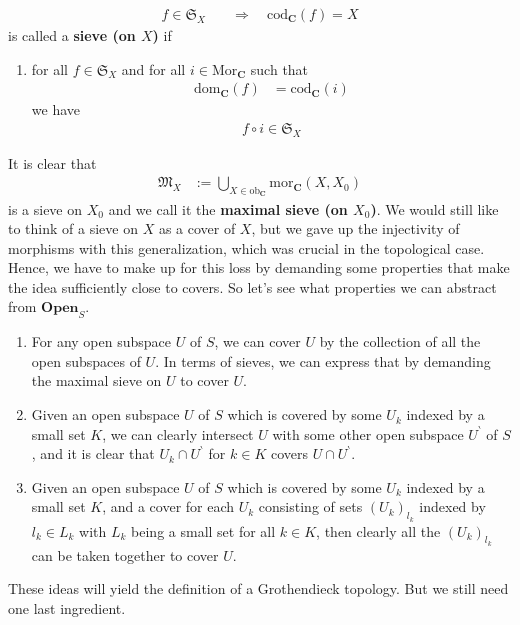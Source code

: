 \begin{exa}
\begin{align*}
  f
  \in
  \mathfrak{S}_{X}
  \quad
  &\Rightarrow
  \quad
  \mathrm{cod}_{\mathbf{C}}(f)
  =
  X
\end{align*}
is called a \textbf{sieve (on $X$)} if
\begin{enumerate}
\item[({\#})]
for all $f \in \mathfrak{S}_{X}$ and for all $i \in \mathrm{Mor}_{\mathbf{C}}$ such that
\begin{align*}
  \mathrm{dom}_{\mathbf{C}}(f)
  &=
  \mathrm{cod}_{\mathbf{C}}(i)
\end{align*}
we have
\begin{align*}
  f
  \circ
  i
  \in
  \mathfrak{S}_{X}
\end{align*}
\end{enumerate}
It is clear that
\begin{align*}
  \mathfrak{M}_{X}
  &:=
  \bigcup_{X \in \mathrm{ob}_{\mathbf{C}}}
  \mathrm{mor}_{\mathbf{C}}(X,X_{0})
\end{align*}
is a sieve on $X_{0}$ and we call it the \textbf{maximal sieve (on $X_{0}$)}.
We would still like to think of a sieve on $X$ as a cover of $X$, but we gave up the injectivity of morphisms with this generalization, which was crucial in the topological case.
Hence, we have to make up for this loss by demanding some properties that make the idea sufficiently close to covers.
So let's see what properties we can abstract from $\mathbf{Open}_{S}$.
\begin{enumerate}
\item[(1)]
For any open subspace $U$ of $S$, we can cover $U$ by the collection of all the open subspaces of $U$.
In terms of sieves, we can express that by demanding the maximal sieve on $U$ to cover $U$.
\item[(2)]
Given an open subspace $U$ of $S$ which is covered by some $U_{k}$ indexed by a small set $K$, we can clearly intersect $U$ with some other open subspace $U^{\backprime}$ of $S$, and it is clear that $U_{k} \cap U^{\backprime}$ for $k \in K$ covers $U \cap U^{\backprime}$.
\item[(3)]
Given an open subspace $U$ of $S$ which is covered by some $U_{k}$ indexed by a small set $K$, and a cover for each $U_{k}$ consisting of sets $(U_{k})_{l_{k}}$ indexed by $l_{k} \in L_{k}$ with $L_{k}$ being a small set for all $k \in K$, then clearly all the $(U_{k})_{l_{k}}$ can be taken together to cover $U$.
\end{enumerate}
These ideas will yield the definition of a Grothendieck topology.
But we still need one last ingredient.

\end{exa}
